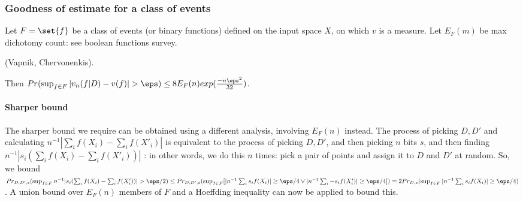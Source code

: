 \documentclass[oneside, article]{memoir}
\begin{document}
\subsubsection{Goodness of estimate for a class of events}
Let $F = \set{f}$ be a class of events (or binary functions) defined on the input space $X$, on which $v$ is a measure. Let $E_{F}(m)$ be max dichotomy count: see boolean functions survey.

(Vapnik, Chervonenkis).

Then $Pr(\sup_{f \in F} |v_n(f|D) - v(f)| > \eps) \leq 8 E_{F}(n)exp(\frac{-n\eps^{2}}{32})$.


\paragraph*{Sharper bound}
The sharper bound we require can be obtained using a different analysis, involving $E_F(n)$ instead. The process of picking $D, D'$ and calculating $n^{-1}|\sum_i f(X_i) - \sum_i f(X'_i)|$ is equivalent to the process of picking $D, D'$, and then picking $n$ bits $s$, and then finding $n^{-1}|s_i(\sum_i f(X_i) - \sum_i f(X'_i))|$ : in other words, we do this $n$ times: pick a pair of points and assign it to $D$ and $D'$ at random. So, we bound $Pr_{D, D',s }(\sup_{f \in F} n^{-1}|s_i(\sum_i f(X_i) - \sum_i f(X'_i))|> \eps/2) \leq Pr_{D, D',s }(\sup_{f \in F} [|n^{-1}\sum_i s_if(X_i)| \geq \eps/4 \lor |n^{-1}\sum_i -s_if(X'_i)| \geq \eps/4]) = 2Pr_{D, s}(\sup_{f \in F} |n^{-1}\sum_i s_if(X_i)| \geq \eps/4)$. A union bound over $E_F(n)$ members of $F$ and a Hoeffding inequality can now be applied to bound this.
\end{document}
